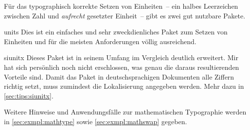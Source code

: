 %
Für das typographisch korrekte Setzen von Einheiten~-- ein halbes Leerzeichen 
zwischen Zahl und \emph{aufrecht} gesetzter Einheit~-- gibt es zwei gut 
nutzbare Pakete.
%
\begin{packages}
\item[units]
  Dies ist ein einfaches und sehr zweckdienliches Paket zum Setzen von 
  Einheiten und für die meisten Anforderungen völlig ausreichend.
\item[siunitx]
  Dieses Paket ist in seinem Umfang im Vergleich deutlich erweitert. Mir hat 
  sich persönlich noch nicht erschlossen, was genau die daraus resultierenden 
  Vorteile sind. Damit das Paket in deutschsprachigen Dokumenten alle Ziffern 
  richtig setzt, muss zumindest die Lokalisierung angegeben werden. Mehr dazu 
  in \autoref{sec:tips:siunitx}.
\end{packages}
%
Weitere Hinweise und Anwendungsfälle zur mathematischen Typographie werden in 
\autoref{sec:exmpl:mathtype} sowie \autoref{sec:exmpl:mathswap} gegeben.

